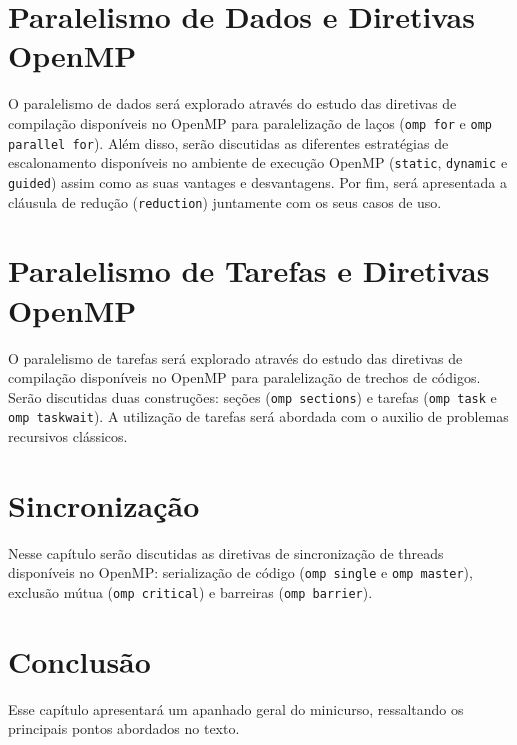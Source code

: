 \documentclass{SBCbookchapter}
\begin{document}
\section{Paralelismo de Dados e Diretivas OpenMP}

	O paralelismo de dados será explorado através do estudo das diretivas de
	compilação disponíveis no OpenMP para paralelização de laços
	(\texttt{omp for} e \texttt{omp parallel for}). Além disso, serão
	discutidas as diferentes estratégias de escalonamento disponíveis no
	ambiente de execução OpenMP (\texttt{static}, \texttt{dynamic} e
	\texttt{guided}) assim como as suas vantages e desvantagens. Por fim,
	será apresentada a cláusula de redução (\texttt{reduction}) juntamente
	com os seus casos de uso.

\section{Paralelismo de Tarefas e Diretivas OpenMP}

	O paralelismo de tarefas será explorado através do estudo das diretivas
	de compilação disponíveis no OpenMP para paralelização de trechos de
	códigos. Serão discutidas duas construções: seções (\texttt{omp
	sections}) e tarefas (\texttt{omp task} e \texttt{omp taskwait}). A
	utilização de tarefas será abordada com o auxilio de problemas
	recursivos clássicos.

\section{Sincronização}
\label{section: sincronizacao}

	Nesse capítulo serão discutidas as diretivas de sincronização de threads
	disponíveis no OpenMP: serialização de código (\texttt{omp single} e
	\texttt{omp master}), exclusão mútua (\texttt{omp critical}) e barreiras
	(\texttt{omp barrier}).

\section{Conclusão}

	Esse capítulo apresentará um apanhado geral do minicurso, ressaltando os
	principais pontos abordados no texto.


\end{document}
